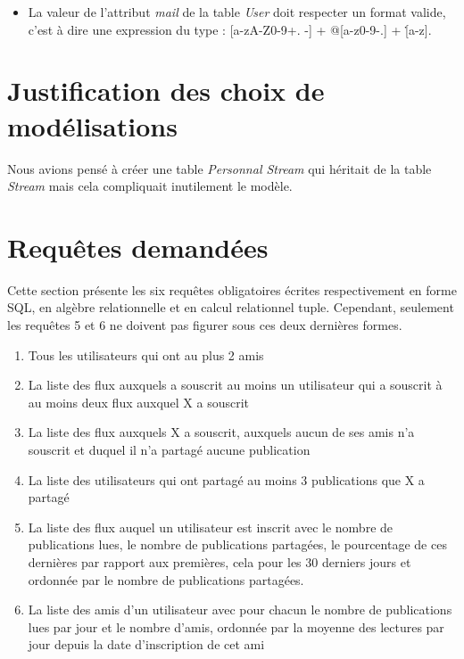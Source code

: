 \documentclass[a4paper,10pt]{article}
\begin{document}
	\begin{itemize}
	    \item La valeur de l'attribut \textit{mail} de la table \textit{User} doit respecter un format valide, c'est à dire une expression du type : [a-zA-Z0-9+. -] + @[a-z0-9-.] + \.[a-z].
	\end{itemize}

\section{Justification des choix de modélisations}

Nous avions pensé à créer une table \textit{Personnal Stream} qui héritait de la table \textit{Stream} mais cela compliquait inutilement le modèle.

\section{Requêtes demandées}

Cette section présente les six requêtes obligatoires écrites respectivement en forme SQL, en algèbre relationnelle et en calcul relationnel tuple. Cependant, seulement les requêtes 5 et 6 ne doivent pas figurer sous ces deux dernières formes.

	\begin{enumerate}
	    \item Tous les utilisateurs qui ont au plus 2 amis
	    \item La liste des flux auxquels a souscrit au moins un utilisateur qui a souscrit à au moins deux flux auxquel X a souscrit
	    \item La liste des flux auxquels X a souscrit, auxquels aucun de ses amis n’a souscrit et duquel il n’a partagé aucune publication
	    \item La liste des utilisateurs qui ont partagé au moins 3 publications que X a partagé
	    \item La liste des flux auquel un utilisateur est inscrit avec le nombre de publications lues, le nombre de publications partagées, le pourcentage de ces dernières par rapport aux premières, cela pour les 30 derniers jours et ordonnée par le nombre de publications partagées.
	    \item La liste des amis d’un utilisateur avec pour chacun le nombre de publications lues par jour et le nombre d’amis, ordonnée par la moyenne des lectures par jour depuis la date d’inscription de cet ami
	\end{enumerate}
\end{document}
